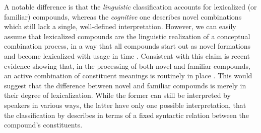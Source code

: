 \documentclass[output=paper]{langsci/langscibook}
\begin{document}
A notable difference is that the \emph{linguistic} classification accounts for lexicalized (or familiar) compounds, whereas the \emph{cognitive} one describes novel combinations which still lack a single, well-defined interpretation. However, we can easily assume that lexicalized compounds are the linguistic realization of a conceptual combination process, in a way that all compounds start out as novel formations and become lexicalized with usage in time \citep{gagne2006}. Consistent with this claim is recent evidence showing that, in the processing of both novel and familiar compounds, an active combination of constituent meanings is routinely in place \citep{gagnesp2009,ji2011,marelli2012,marelli2014}. This would suggest that the difference between novel and familiar compounds is merely in their degree of lexicalization. While the former can still be interpreted by speakers in various ways, the latter have only one possible interpretation, that the classification by \cite{SB2005} describes in terms of a fixed syntactic relation between the compound's constituents.


\end{document}
